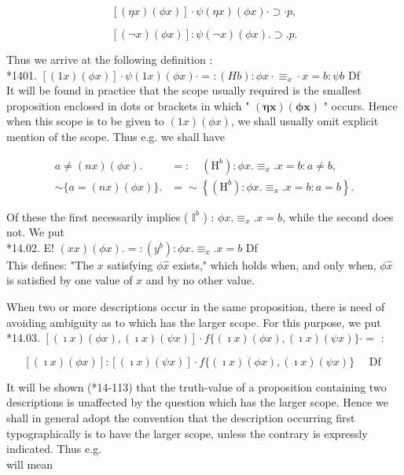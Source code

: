 \documentclass[10pt]{article}
\begin{document}
$$
[(\eta x)(\phi x)] \cdot \psi(\eta x)(\phi x) \cdot \supset \cdot p,
$$

$$
[(\neg x)(\phi x)]: \psi(\neg x)(\phi x) . \supset . p .
$$

Thus we arrive at the following definition :\\
*1401. $[(1 x)(\phi x)] \cdot \psi(1 x)(\phi x) \cdot=:(H b): \phi x \cdot \equiv_{x} \cdot x=b: \psi b$ Df\\
It will be found in practice that the scope usually required is the smallest proposition enclosed in dots or brackets in which " $(\boldsymbol{\eta} \boldsymbol{x})(\boldsymbol{\phi} \boldsymbol{x})$ " occurs. Hence when this scope is to be given to $(1 x)(\phi x)$, we shall usually omit explicit mention of the scope. Thus e.g. we shall have

$$
\begin{aligned}
a \neq(n x)(\phi x) . & =: \quad\left(\mathrm{H}^{b}\right): \phi x . \equiv_{x} . x=b: a \neq b, \\
\sim\{a=(n x)(\phi x)\} . & =\sim\left\{\left(\mathrm{H}^{b}\right): \phi x . \equiv_{x} . x=b: a=b\right\} .
\end{aligned}
$$

Of these the first necessarily implies ( $\mathbb{I}^{b}$ ) : $\phi x . \equiv_{x} . x=b$, while the second does not. We put\\
*14.02. E! $(x x)(\phi x) .=:\left(y^{b}\right): \phi x . \equiv_{x} . x=b$ Df\\
This defines: "The $x$ satisfying $\phi \hat{x}$ exists," which holds when, and only when, $\phi \hat{x}$ is satisfied by one value of $x$ and by no other value.

When two or more descriptions occur in the same proposition, there is need of avoiding ambiguity as to which has the larger scope. For this purpose, we put\\
*14.03. $[(\imath x)(\phi x),(\imath x)(\psi x)] \cdot f\{(\imath x)(\phi x),(\imath x)(\psi x)\} \cdot=$ :

$$
[(\imath x)(\phi x)]:[(\imath x)(\psi x)] \cdot f\{(\imath x)(\phi x),(\imath x)(\psi x)\} \quad \text { Df }
$$

It will be shown (*14-113) that the truth-value of a proposition containing two descriptions is unaffected by the question which has the larger scope. Hence we shall in general adopt the convention that the description occurring first typographically is to have the larger scope, unless the contrary is expressly indicated. Thus e.g.\\
will mean
\end{document}
